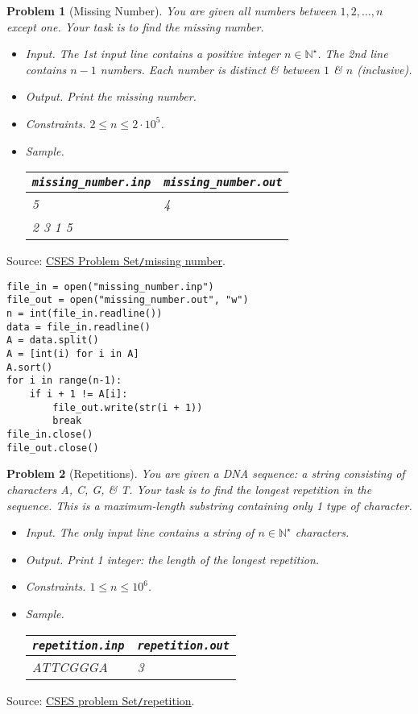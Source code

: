 \documentclass{article}
\newtheorem{problem}{Problem}
\begin{document}
\begin{problem}[Missing Number]
	You are given all numbers between $1,2,\ldots,n$ except one. Your task is to find the missing number.
	\begin{itemize}
		\item {\sf Input.} The 1st input line contains a positive integer $n\in\mathbb{N}^\star$. The 2nd line contains $n - 1$ numbers. Each number is distinct \& between $1$ \& $n$ (inclusive).
		\item {\sf Output.} Print the missing number.
		\item {\sf Constraints.} $2\le n\le2\cdot10^5$.
		\item {\sf Sample.}
		\begin{table}[H]
			\centering
			\begin{tabular}{|l|l|}
				\hline
				\verb|missing_number.inp| & \verb|missing_number.out| \\
				\hline
				5 & 4 \\
				2 3 1 5 & \\
				\hline
			\end{tabular}
		\end{table}
	\end{itemize}
\end{problem}
Source: \href{https://cses.fi/problemset/task/1083}{CSES Problem Set\texttt{/}missing number}.

\begin{verbatim}
file_in = open("missing_number.inp")
file_out = open("missing_number.out", "w")
n = int(file_in.readline())
data = file_in.readline()
A = data.split()
A = [int(i) for i in A]
A.sort()
for i in range(n-1):
    if i + 1 != A[i]:
        file_out.write(str(i + 1))
        break
file_in.close()
file_out.close()
\end{verbatim}

\begin{problem}[Repetitions]
	You are given a DNA sequence: a string consisting of characters A, C, G, \& T. Your task is to find the longest repetition in the sequence. This is a maximum-length substring containing only 1 type of character.
	\begin{itemize}
		\item {\sf Input.} The only input line contains a string of $n\in\mathbb{N}^\star$ characters.
		\item {\sf Output.} Print 1 integer: the length of the longest repetition.
		\item {\sf Constraints.} $1\le n\le10^6$.
		\item {\sf Sample.}
		\begin{table}[H]
			\centering
			\begin{tabular}{|l|l|}
				\hline
				\verb|repetition.inp| & \verb|repetition.out| \\
				\hline
				ATTCGGGA & 3 \\
				\hline
			\end{tabular}
		\end{table}
	\end{itemize}	
\end{problem}
Source: \href{https://cses.fi/problemset/task/1069}{CSES problem Set\texttt{/}repetition}.
\end{document}
